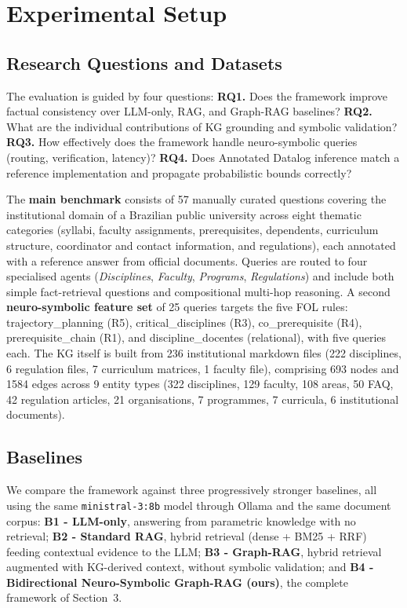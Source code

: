 \documentclass[12pt]{article}
\begin{document}
\section{Experimental Setup}

\subsection{Research Questions and Datasets}

The evaluation is guided by four questions: \textbf{RQ1.} Does the framework improve factual consistency over LLM-only, RAG, and Graph-RAG baselines? \textbf{RQ2.} What are the individual contributions of KG grounding and symbolic validation? \textbf{RQ3.} How effectively does the framework handle neuro-symbolic queries (routing, verification, latency)? \textbf{RQ4.} Does Annotated Datalog inference match a reference implementation and propagate probabilistic bounds correctly?

The \textbf{main benchmark} consists of 57 manually curated questions covering the institutional domain of a Brazilian public university across eight thematic categories (syllabi, faculty assignments, prerequisites, dependents, curriculum structure, coordinator and contact information, and regulations), each annotated with a reference answer from official documents. Queries are routed to four specialised agents (\textit{Disciplines}, \textit{Faculty}, \textit{Programs}, \textit{Regulations}) and include both simple fact-retrieval questions and compositional multi-hop reasoning. A second \textbf{neuro-symbolic feature set} of 25 queries targets the five FOL rules: trajectory\_planning (R5), critical\_disciplines (R3), co\_prerequisite (R4), prerequisite\_chain (R1), and discipline\_docentes (relational), with five queries each. The KG itself is built from 236 institutional markdown files (222 disciplines, 6 regulation files, 7 curriculum matrices, 1 faculty file), comprising 693 nodes and 1584 edges across 9 entity types (322 disciplines, 129 faculty, 108 areas, 50 FAQ, 42 regulation articles, 21 organisations, 7 programmes, 7 curricula, 6 institutional documents).

\subsection{Baselines}

We compare the framework against three progressively stronger baselines, all using the same \texttt{ministral-3:8b} model through Ollama and the same document corpus: \textbf{B1 - LLM-only}, answering from parametric knowledge with no retrieval; \textbf{B2 - Standard RAG}, hybrid retrieval (dense + BM25 + RRF) feeding contextual evidence to the LLM; \textbf{B3 - Graph-RAG}, hybrid retrieval augmented with KG-derived context, without symbolic validation; and \textbf{B4 - Bidirectional Neuro-Symbolic Graph-RAG (ours)}, the complete framework of Section~3.
\end{document}

